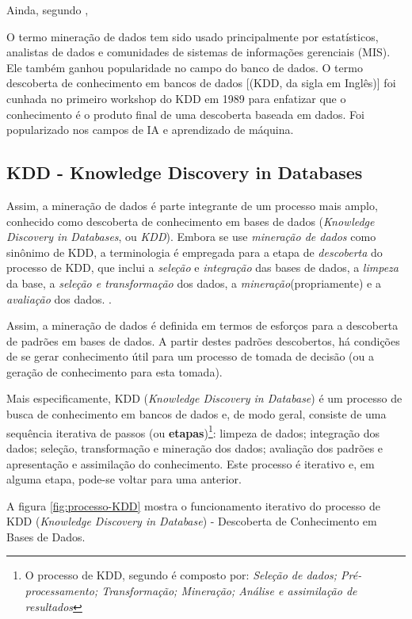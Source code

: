 Ainda, segundo , 
\begin{citacao}
	O termo mineração de dados tem sido usado principalmente por estatísticos, analistas de dados e comunidades de sistemas de informações gerenciais (MIS). Ele também ganhou popularidade no campo do banco de dados. O termo descoberta de conhecimento em bancos de dados [(KDD, da sigla em Inglês)] foi cunhada no primeiro workshop do KDD em 1989 para enfatizar que o conhecimento é o produto final de uma descoberta baseada em dados. Foi popularizado nos campos de IA e aprendizado de máquina.
\end{citacao}

\subsection{KDD - Knowledge Discovery in Databases}
Assim, a mineração de dados é parte integrante de um processo mais amplo, conhecido como descoberta de conhecimento em bases de dados (\textit{Knowledge Discovery in Databases}, ou \textit{KDD})\cite{fayyad1996}. Embora se use \textit{mineração de dados} como sinônimo de KDD, a terminologia é empregada para a etapa de \textit{descoberta}  do processo de KDD, que inclui a \textit{seleção} e \textit{integração} das bases de dados, a \textit{limpeza} da base, a \textit{seleção e transformação} dos dados, a \textit{mineração}(propriamente) e a \textit{avaliação} dos dados. \cite{ferrari2017}\cite{Boscarioli2017}.

Assim, a mineração de dados  é definida em termos de esforços para a descoberta de padrões em bases de dados. A partir destes padrões descobertos, há condições de se gerar conhecimento útil para um processo de tomada de decisão (ou a geração de conhecimento para esta tomada).

Mais especificamente, KDD (\textit{Knowledge Discovery in Database}) é um processo de busca de conhecimento em bancos de dados e, de modo geral, consiste de uma sequência iterativa de passos (ou \textbf{etapas})\footnote{O processo de KDD, segundo \cite{fayyad1996} é composto por: \textit{Seleção de dados; Pré-processamento; Transformação; Mineração; Análise e assimilação de resultados}}: limpeza de dados; integração dos dados; seleção, transformação e mineração dos dados; avaliação dos padrões e apresentação e assimilação do conhecimento. Este processo é iterativo e, em alguma etapa, pode-se voltar para uma anterior. \cite{Boscarioli2017}

A figura \ref{fig:processo-KDD} mostra o funcionamento iterativo do processo de KDD (\textit{Knowledge Discovery in Database}) -  Descoberta de Conhecimento em Bases de Dados.

